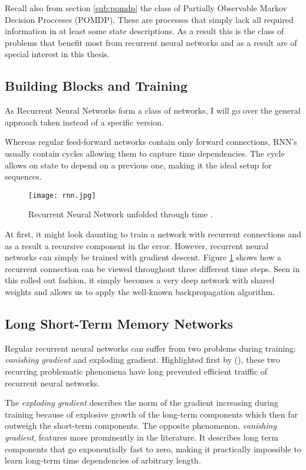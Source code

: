 Recall also from section \ref{sub:pomdp}
the class of Partially Observable Markov Decision Procceses (POMDP).
These are processes that simply lack all required information in
at least some state descriptions.
As a result this is the class of problems that benefit most
from recurrent neural networks
and as a result are of special interest in this thesis.

\subsection{Building Blocks and Training}
\label{sub:building_blocks_and_training}
As Recurrent Neural Networks form a class of networks,
I will go over the general approach taken instead of a specific version.

Whereas regular feed-forward networks contain only forward connections,
RNN's usually contain cycles allowing them to capture time dependencies.
The cycle allows on state to depend on a previous one,
making it the ideal setup for sequences.

\begin{figure}[htpb]
  \centering
  \texttt{[image: rnn.jpg]}
  \caption{Recurrent Neural Network unfolded through time
  \parencite{Y.2015dl}.
  }
  \label{fig:rnn}
\end{figure}

At first, it might look daunting to train a network with recurrent connections
and as a result a recursive component in the error.
However, recurrent neural networks can simply be trained with gradient descent.
Figure \ref{fig:rnn} shows how a recurrent connection can be viewed
throughout three different time steps.
Seen in this rolled out fashion,
it simply becomes a very deep network with shared weights
and allows us to apply the well-known backpropagation algorithm.

\subsection{Long Short-Term Memory Networks}
\label{sub:lstm}
Regular recurrent neural networks can suffer from two problems during training:
\textit{vanishing gradient} and {exploding gradient}.
Highlighted first by
\citeauthor{Bengio1994} (\citeyear{Bengio1994}),
these two recurring problematic phenomena have long prevented
efficient traiffic of recurrent neural networks.

The \textit{exploding gradient} describes the norm of the gradient
increasing during training
because of explosive growth of the long-term components
which then far outweigh the short-term components.
The opposite phenomenon, \textit{vanishing gradient},
features more prominently in the literature.
It describes long term components that go exponentially fast to zero,
making it practically impossible to learn
long-term time dependencies of arbitrary length.

